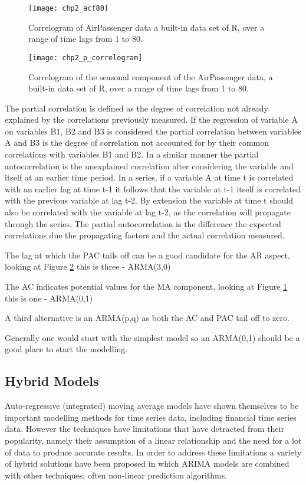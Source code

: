 \begin{figure}[tbph!]
\centering
\texttt{[image: chp2\_acf80]}
\caption[Correlogram of auto-correlations]{Correlogram of AirPassenger data a built-in data set of R, over a range of time lags from 1 to 80.}
\label{fig:acf80}
\end{figure}

\begin{figure}[tbph!]
\centering
\texttt{[image: chp2\_p\_correlogram]}
\caption[Correlogram of a seasonal component]{Correlogram of the seasonal component of the AirPassenger data, a built-in data set of R, over a range of time lags from 1 to 80.}
\label{fig:correlogram}
\end{figure}

The partial correlation is defined as the degree of correlation not already explained by the correlations previously measured. If the regression of variable A on variables B1, B2 and B3 is considered the partial correlation between variables A and B3 is the degree of correlation not accounted for by their common correlations with variables B1 and B2. In a similar manner the partial autocorrelation is the unexplained correlation after considering the variable and itself at an earlier time period. In a series, if a variable A at time t is correlated with an earlier lag at time t-1 it follows that the variable at t-1 itself is correlated with the previous variable at lag t-2. By extension the variable at time t should also be correlated with the variable at lag t-2, as the correlation will propagate through the series. The partial autocorrelation is the difference the expected correlations due the propagating factors and the actual correlation measured.

\label{todo3}
The lag at which the PAC tails off can be a good candidate for the AR aspect, looking at Figure \ref{fig:correlogram} this is three - ARMA(3,0)

The AC indicates potential values for the MA component, looking at Figure \ref{fig:acf80} this is one - ARMA(0,1)

A third alternative is an ARMA(p,q) as both the AC and PAC tail off to zero.

Generally one would start with the simplest model so an ARMA(0,1) should be a good place to start the modelling.

\subsection{Hybrid Models}
Auto-regressive (integrated) moving average models have shown themselves to be important modelling methods for time series data, including financial time series data. However the techniques have limitations that have detracted from their popularity, namely their assumption of a linear relationship and the need for a lot of data to produce accurate results. In order to address these limitations a variety of hybrid solutions have been proposed in which ARIMA models are combined with other techniques, often non-linear prediction algorithms.

